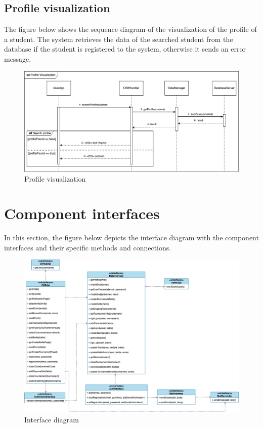 \subsection{Profile visualization}
The figure below shows the sequence diagram of the visualization of the profile of a student. 
The system retrieves the data of the searched student from the database if the student is registered to the system, otherwise it sends an error message.
\begin{figure}[H]
    \centering
    \includegraphics[width=1\textwidth]{images/seq_diagrams/ProfileVis_DD.png}
    \caption{Profile visualization}
\end{figure}

\section{Component interfaces}
In this section, the figure below depicts the interface diagram with the component interfaces and their specific methods and connections.
\begin{figure}[H]
    \centering
    \includegraphics[width=1\textwidth]{images/Interface_diagram.png}
    \caption{Interface diagram}
\end{figure}

